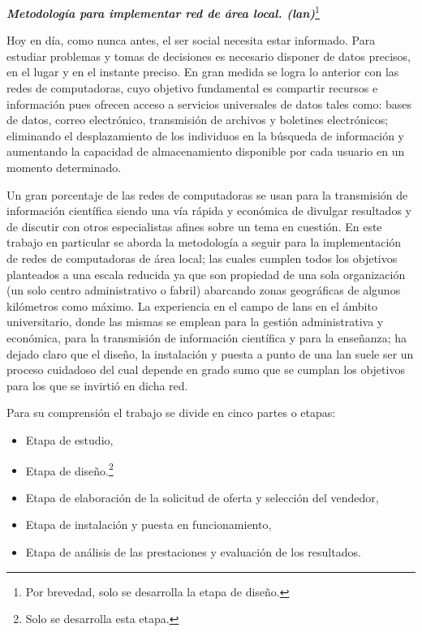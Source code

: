 \vspace{.5 cm}


\textbf{\emph{Metodología para implementar red de área local. (\gls{lan}\@)}}\footnote{Por brevedad, solo se desarrolla la etapa de diseño.}

\vspace{.3 cm}

Hoy en día, como nunca antes, el ser social necesita estar informado. Para estudiar problemas y tomas de decisiones es necesario disponer de datos precisos, en el lugar y en el instante preciso. En gran medida se logra lo anterior con las redes de computadoras, cuyo objetivo fundamental es compartir recursos e información pues ofrecen acceso a servicios universales de datos tales como: bases de datos, correo electrónico, transmisión de archivos y boletines electrónicos; eliminando el desplazamiento de los individuos en la búsqueda de información y aumentando la capacidad de almacenamiento disponible por cada usuario en un momento determinado.

Un gran porcentaje de las redes de computadoras se usan para la transmisión de información científica siendo una vía rápida y económica de divulgar resultados y de discutir con otros especialistas afines sobre un tema en cuestión. En este trabajo en particular se aborda la metodología a seguir para la implementación de redes de computadoras de área local; las cuales cumplen todos los objetivos planteados a una escala reducida ya que son propiedad de una sola organización (un solo centro administrativo o fabril) abarcando zonas geográficas de algunos kilómetros como máximo. La experiencia en el campo de \glspl{lan} en el ámbito universitario, donde las mismas se emplean para la gestión administrativa y económica, para la transmisión de información científica y para la enseñanza; ha dejado claro que el diseño, la instalación y puesta a punto de una \gls{lan} suele ser un proceso cuidadoso del cual depende en grado sumo que se cumplan los objetivos para los que se invirtió en dicha red.

Para su comprensión el trabajo se divide en cinco partes o etapas:
\begin{itemize}
\item Etapa de estudio,
\item Etapa de diseño.\footnote{Solo se desarrolla esta etapa.}
\item Etapa de elaboración de la solicitud de oferta y selección del vendedor,
\item Etapa de instalación y puesta en funcionamiento,
\item Etapa de análisis de las prestaciones y evaluación de los resultados.
\end{itemize}
 
